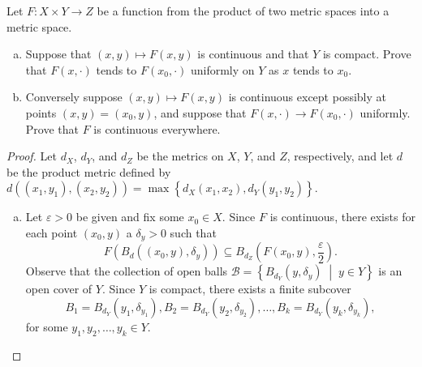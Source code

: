 \documentclass[12pt]{amsart}
\begin{document}
\begin{setup}
  Let $F \colon X \times Y \rightarrow Z$ be a function from the product of two metric spaces into a metric space.
  \begin{enumerate}[(a)]
  \item
    Suppose that $(x,y) \mapsto F(x,y)$ is continuous and that $Y$ is compact.
    Prove that $F(x,\cdot)$ tends to $F(x_0, \cdot)$ uniformly on $Y$ as $x$ tends to $x_0$.
  \item
    Conversely suppose $(x,y) \mapsto F(x,y)$ is continuous except possibly at points $(x,y) = (x_0, y)$, and suppose that $F(x, \cdot) \rightarrow F(x_0, \cdot)$ uniformly.
    Prove that $F$ is continuous everywhere.
  \end{enumerate}
  \begin{proof}
    Let $d_X$, $d_Y$, and $d_Z$ be the metrics on $X$, $Y$, and $Z$, respectively, and let $d$ be the product metric defined by $d((x_1,y_1), (x_2,y_2)) = \max \left\{d_X(x_1, x_2), d_Y(y_1, y_2)\right\}$.
    \begin{enumerate}[(a)]
    \item
      Let $\varepsilon > 0$ be given and fix some $x_0 \in X$.
      Since $F$ is continuous, there exists for each point $(x_0, y)$ a $\delta_y > 0$ such that 
      \begin{equation}\label{18.1}
        F\left(B_d \left( \left(x_0,y\right), \delta_y\right)\right)\subseteq B_{d_Z}\left(F \left(x_0, y\right), \frac{\varepsilon}{2}\right).
      \end{equation}
      Observe that the collection of open balls $\mathcal{B} = \left\{B_{d_Y}(y, \delta_y) \;\middle\vert\; y \in Y\right\}$ is an open cover of $Y$.
      Since $Y$ is compact, there exists a finite subcover 
      $$B_1 = B_{d_Y}\left(y_1, \delta_{y_1}\right), B_2 = B_{d_Y}\left(y_2, \delta_{y_2}\right), \ldots, B_k = B_{d_Y}\left(y_k, \delta_{y_k}\right),$$ 
      for some $y_1, y_2, \ldots, y_k \in Y$.


\end{enumerate}
\end{proof}
\end{setup}
\end{document}
